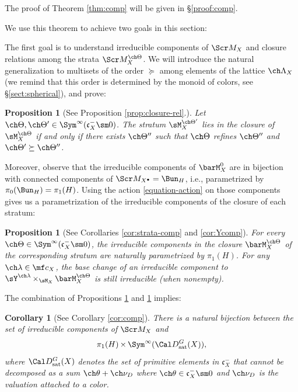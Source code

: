 \documentclass[final]{amsart}
\newtheorem{prop}[subsubsection]{Proposition}
\newtheorem{cor}[subsubsection]{Corollary}
\theoremstyle{remark}
\theoremstyle{definition}
\DeclareMathOperator*{\xt}{\times}
\numberwithin{equation}{section}
\begin{document}
The proof of Theorem \ref{thm:comp} will be given in \S \ref{proof:comp}.

We use this theorem to achieve two goals in this section: 


The first goal is to understand irreducible components of $\Scr M_X$ and closure relations among the strata $\Scr M^{\ch\Theta}_X$. 
We will introduce the natural generalization to multisets of the order $\succeq$ among elements of the lattice $\ch\Lambda_X$ (we remind that this order is determined by the monoid of colors, see \S \ref{sect:spherical}), and prove:
\begin{prop}[See Proposition \ref{prop:closure-rel}.]
\label{proposition-closures}
Let $\ch\Theta,\ch\Theta' \in \Sym^\infty(\mathfrak c_X^-\sm 0)$. 
The stratum $\sM^{\ch\Theta'}_X$ lies in the closure of $\sM^{\ch\Theta}_X$
if and only if there exists $\ch\Theta''$  such that $\ch\Theta$ refines $\ch\Theta''$ and $\ch\Theta' \succeq \ch\Theta''$. 
\end{prop}

Moreover, observe that the irreducible components of $\barM_X^0$ are in bijection with connected components of $\Scr M_{X^\bullet} = \Bun_H$, i.e., parametrized by $\pi_0(\Bun_H) = \pi_1(H)$. Using the action \eqref{equation-action} on those components gives us a parametrization of the irreducible components of the closure of each stratum:
\begin{prop}[See Corollaries \ref{cor:strata-comp} and \ref{cor:Ycomp}]
\label{proposition-irred-strata}
For every $\ch\Theta \in \Sym^\infty(\mathfrak c_X^-\sm 0)$, the irreducible components in the closure $\barM_X^{\ch\Theta}$ of the corresponding stratum are naturally parametrized by $\pi_1(H)$. 
For any $\ch\lambda \in \mf c_X$, the base change of 
an irreducible component to $\sY^{\ch\lambda} \xt_{\sM_X} 
\barM_X^{\ch\Theta}$ is still irreducible (when nonempty).
\end{prop}

The combination of Propositions \ref{proposition-closures} and \ref{proposition-irred-strata} implies:

\begin{cor}[See Corollary \ref{cor:comp}] 
There is a natural bijection between the set of irreducible
components of $\Scr M_X$ and 
\[ \pi_1(H) \xt \Sym^\infty(\Cal D^G_{\mathrm{sat}}(X)),\]
where $\Cal D^G_{\mathrm{sat}}(X)$ denotes the set of primitive elements in $\mathfrak c_X^-$ that
cannot be decomposed as a sum $\ch\theta+\ch\nu_D$ where 
$\ch\theta\in  \mathfrak c_X^-\sm 0$ and $\ch\nu_D$ is the valuation attached to a color. 
\end{cor}
\end{document}
